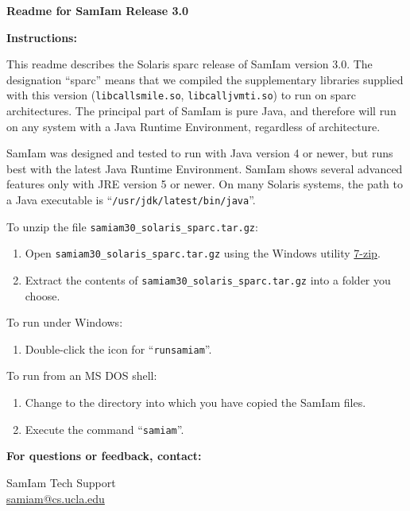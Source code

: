 \documentclass[10pt]{report}
\newcommand{\samiamversion}{3.0}
\newcommand{\samiamversionfylename}{30}
\newcommand{\architecture}{sparc}
\newcommand{\operatingsystem}{Solaris}
\newcommand{\fylenamecallsmile}{libcallsmile.so}
\newcommand{\fylenameprofiler}{libcalljvmti.so}
\newcommand{\fileseparator}{/}
\newcommand{\pathjavaexe}{{\fileseparator}usr{\fileseparator}jdk{\fileseparator}latest{\fileseparator}bin{\fileseparator}java}
\newcommand{\fylenamerunscript}{runsamiam}
\newcommand{\fylenamedownload}{samiam{\samiamversionfylename}\_solaris\_{\architecture}.tar.gz}
\newcommand{\TAR}{gnutar}
\newcommand{\architecture}{i386}
\newcommand{\operatingsystem}{Mac OS X}
\newcommand{\fylenamecallsmile}{libcallsmile.jnilib}
\newcommand{\fylenameprofiler}{libcalljvmti.jnilib}
\newcommand{\fileseparator}{/}
\newcommand{\pathjavaexe}{{\fileseparator}usr{\fileseparator}bin{\fileseparator}java}
\newcommand{\fylenamerunscript}{runsamiam}
\newcommand{\fylenamedownload}{samiam{\samiamversionfylename}\_macosx\_{\architecture}.tar.gz}
\newcommand{\TAR}{tar}
\newcommand{\architecture}{amd64}
\newcommand{\architecture}{i386}
\newcommand{\operatingsystem}{Linux}
\newcommand{\fylenamecallsmile}{libcallsmile.so}
\newcommand{\fylenameprofiler}{libcalljvmti.so}
\newcommand{\fileseparator}{/}
\newcommand{\pathjavaexe}{{\fileseparator}usr{\fileseparator}bin{\fileseparator}java}
\newcommand{\fylenamerunscript}{runsamiam}
\newcommand{\fylenamedownload}{samiam{\samiamversionfylename}\_linux\_{\architecture}.tar.gz}
\newcommand{\TAR}{tar}
\newcommand{\architecture}{amd64}
\newcommand{\fylenamedownload}{samiam{\samiamversionfylename}\_windows\_{\architecture}.zip}
\newcommand{\architecture}{i386}
\newcommand{\fylenamedownload}{samiam{\samiamversionfylename}\_windows\_{\architecture}.zip}
\newcommand{\operatingsystem}{Windows}
\newcommand{\fylenamecallsmile}{callsmile.dll}
\newcommand{\fylenameprofiler}{calljvmti.dll}
\newcommand{\fileseparator}{\textbackslash}
\newcommand{\pathjavaexe}{C:{\fileseparator}Windows{\fileseparator}System32{\fileseparator}java.exe}
\newcommand{\fylenamerunscript}{samiam.bat}
\newcommand{\instructionsunzip}{\begin{enumerate}[itemsep=0pt,topsep=0mm,label=\arabic*)]
\parskip     2pt
\item Open \texttt{{\fylenamedownload}} using the Windows utility \href{http://www.7-zip.org}{7-zip}.
\item Extract the contents of \texttt{{\fylenamedownload}} into a folder you choose.
\end{enumerate}}
\newcommand{\instructionsrun}{To run under Windows:
\parskip     4pt
\begin{enumerate}[itemsep=0pt,topsep=0mm,label=\arabic*)]
\parskip     2pt
\item Double-click the icon for {\textquotedblleft}\texttt{{\fylenamerunscript}}{\textquotedblright}.
\end{enumerate}
\parskip     8pt

To run from an MS DOS shell:
\parskip     4pt
\begin{enumerate}[itemsep=0pt,topsep=0mm,label=\arabic*)]
\parskip     2pt
\item Change to the directory into which you have copied the SamIam files.
\item Execute the command {\textquotedblleft}\texttt{samiam}{\textquotedblright}.
\end{enumerate}}
\newcommand{\instructionsunzip}{\parskip     4pt
\begin{enumerate}[itemsep=0pt,topsep=0mm,label=\arabic*)]
\parskip     2pt
\item Change to the directory that contains the file \texttt{{\fylenamedownload}}
\item Execute the command {\textquotedblleft}\texttt{{\TAR} xzf {\fylenamedownload}}{\textquotedblright}
\end{enumerate}}
\newcommand{\instructionsrun}{To run SamIam:
\parskip     4pt
\begin{enumerate}[itemsep=0pt,topsep=0mm,label=\arabic*)]
\parskip     2pt
\item Change to the SamIam installation directory, {\textquotedblleft}\texttt{samiam{\fileseparator}}{\textquotedblright}
\item Execute the command {\textquotedblleft}\texttt{.{\fileseparator}{\fylenamerunscript}}{\textquotedblright}
\end{enumerate}}
\newcommand{\librarynames}{\texttt{{\fylenamecallsmile}}, \texttt{{\fylenameprofiler}}}
\begin{document}
\begin{center}
\fontsize{16}{22}\selectfont
\textbf{Readme for SamIam Release {\samiamversion}}
\end{center}

\fontsize{10}{12}\selectfont
\parskip  32pt
\textbf{Instructions:}
\parskip   8pt

This readme describes the {\operatingsystem} {\architecture} release of SamIam version {\samiamversion}.
The designation {\textquotedblleft}{\architecture}{\textquotedblright}
means that we compiled the supplementary libraries supplied with
this version ({\librarynames}) to run on {\architecture} architectures.
The principal part of SamIam is pure Java,
and therefore will run on any system with a Java Runtime Environment,
regardless of architecture.

SamIam was designed and tested to run with Java version 4 or newer,
but runs best with the latest Java Runtime Environment.
SamIam shows several advanced features only with JRE version 5 or newer.
On many {\operatingsystem} systems, the path to a Java executable is
{\textquotedblleft}\texttt{{\pathjavaexe}}{\textquotedblright}.

To unzip the file \texttt{{\fylenamedownload}}:
\parskip     4pt
{\instructionsunzip}
\parskip     8pt

{\instructionsrun}
\parskip     8pt

\textbf{For questions or feedback, contact:}
\parskip     0pt
\parindent  32pt

\hangindent=32pt SamIam Tech Support \\
\href{mailto:samiam@cs.ucla.edu}{samiam@cs.ucla.edu}
\parskip     8pt
\parindent   0pt
\end{document}
